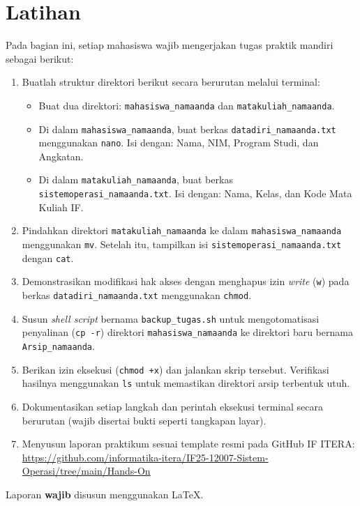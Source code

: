 \newpage
\section{Latihan}
\label{sec:m04-hands-on}

Pada bagian ini, setiap mahasiswa wajib mengerjakan tugas praktik mandiri sebagai berikut:

    \begin{enumerate}
    \item Buatlah struktur direktori berikut secara berurutan melalui terminal:
    \begin{itemize}
        \item Buat dua direktori: \texttt{mahasiswa\_namaanda} dan \texttt{matakuliah\_namaanda}.
        \item Di dalam \texttt{mahasiswa\_namaanda}, buat berkas \texttt{datadiri\_namaanda.txt} menggunakan \texttt{nano}. Isi dengan: Nama, NIM, Program Studi, dan Angkatan.
        \item Di dalam \texttt{matakuliah\_namaanda}, buat berkas \texttt{sistemoperasi\_namaanda.txt}. Isi dengan: Nama, Kelas, dan Kode Mata Kuliah IF.
    \end{itemize}
    \item Pindahkan direktori \texttt{matakuliah\_namaanda} ke dalam \texttt{mahasiswa\_namaanda} menggunakan \texttt{mv}. Setelah itu, tampilkan isi \texttt{sistemoperasi\_namaanda.txt} dengan \texttt{cat}.
    \item Demonstrasikan modifikasi hak akses dengan menghapus izin \textit{write} (\texttt{w}) pada berkas \texttt{datadiri\_namaanda.txt} menggunakan \texttt{chmod}.
    \item Susun \textit{shell script} bernama \texttt{backup\_tugas.sh} untuk mengotomatisasi penyalinan (\texttt{cp -r}) direktori \texttt{mahasiswa\_namaanda} ke direktori baru bernama \texttt{Arsip\_namaanda}.
    \item Berikan izin eksekusi (\texttt{chmod +x}) dan jalankan skrip tersebut. Verifikasi hasilnya menggunakan \texttt{ls} untuk memastikan direktori arsip terbentuk utuh.
    \item Dokumentasikan setiap langkah dan perintah eksekusi terminal secara berurutan (wajib disertai bukti seperti tangkapan layar).
    \item Menyusun laporan praktikum sesuai template resmi pada GitHub IF ITERA:
    \url{https://github.com/informatika-itera/IF25-12007-Sistem-Operasi/tree/main/Hands-On}
\end{enumerate}

Laporan \textbf{wajib} disusun menggunakan \LaTeX.